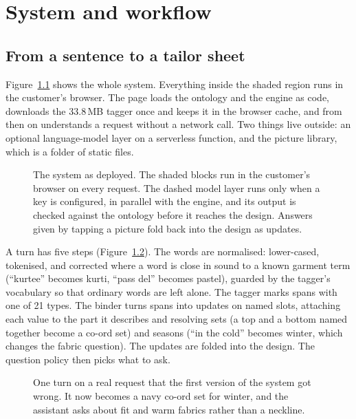 \chapter{System and workflow}\label{ch:system}

\section{From a sentence to a tailor sheet}
Figure~\ref{fig:system} shows the whole system. Everything inside the shaded region runs in the customer's browser. The page loads the ontology and the engine as code, downloads the 33.8\,MB tagger once and keeps it in the browser cache, and from then on understands a request without a network call. Two things live outside: an optional language-model layer on a serverless function, and the picture library, which is a folder of static files.

\begin{figure}[tbp]
\centering
\resizebox{\linewidth}{!}{}
\caption{The system as deployed. The shaded blocks run in the customer's browser on every request. The dashed model layer runs only when a key is configured, in parallel with the engine, and its output is checked against the ontology before it reaches the design. Answers given by tapping a picture fold back into the design as updates.}
\label{fig:system}
\end{figure}

A turn has five steps (Figure~\ref{fig:turn}). The words are normalised: lower-cased, tokenised, and corrected where a word is close in sound to a known garment term (``kurtee'' becomes kurti, ``pass del'' becomes pastel), guarded by the tagger's vocabulary so that ordinary words are left alone. The tagger marks spans with one of 21 types. The binder turns spans into updates on named slots, attaching each value to the part it describes and resolving sets (a top and a bottom named together become a co-ord set) and seasons (``in the cold'' becomes winter, which changes the fabric question). The updates are folded into the design. The question policy then picks what to ask.

\begin{figure}[tbp]
\centering
\resizebox{\linewidth}{!}{}
\caption{One turn on a real request that the first version of the system got wrong. It now becomes a navy co-ord set for winter, and the assistant asks about fit and warm fabrics rather than a neckline.}
\label{fig:turn}
\end{figure}

